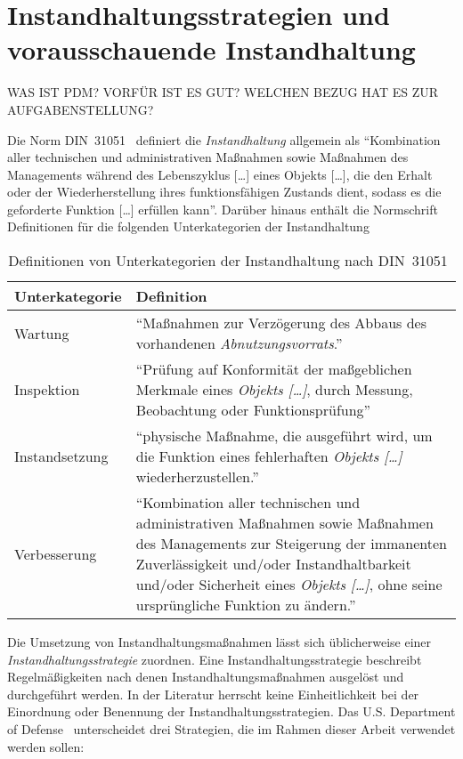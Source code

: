 \chapter{Instandhaltungsstrategien und vorausschauende Instandhaltung}
\label{ch:instandhaltungsstrategien}
WAS IST PDM? VORFÜR IST ES GUT? WELCHEN BEZUG HAT ES ZUR AUFGABENSTELLUNG?

Die Norm DIN~\num{31051}~\cite{DIN.2019} definiert die \textit{Instandhaltung} allgemein als \enquote{Kombination aller technischen und administrativen Maßnahmen sowie Maßnahmen des Managements während des Lebenszyklus [\dots] eines Objekts [\dots], die den Erhalt oder der Wiederherstellung ihres funktionsfähigen Zustands dient, sodass es die geforderte Funktion [\dots] erfüllen kann}. Darüber hinaus enthält die Normschrift Definitionen für die folgenden Unterkategorien der Instandhaltung

\begin{table}[ht]
	\raggedright
	\begin{tabularx}{\textwidth}{ | l | X |}
		\hline
        \rowcolor{lightgray}
        Unterkategorie & Definition\\
        \hline
        Wartung & \enquote{Maßnahmen zur Verzögerung des Abbaus des vorhandenen \textit{Abnutzungsvorrats}.}\\
        \hline
        Inspektion & \enquote{Prüfung auf Konformität der maßgeblichen Merkmale eines \textit{Objekts […]}, durch Messung, Beobachtung oder Funktionsprüfung}\\
        \hline
        Instandsetzung & \enquote{physische Maßnahme, die ausgeführt wird, um die Funktion eines fehlerhaften \textit{Objekts […] }wiederherzustellen.}\\
        \hline
        Verbesserung & \enquote{Kombination aller technischen und administrativen Maßnahmen sowie Maßnahmen des Managements zur Steigerung der immanenten Zuverlässigkeit und/oder Instandhaltbarkeit und/oder Sicherheit eines \textit{Objekts […]}, ohne seine ursprüngliche Funktion zu ändern.}\\
        \hline
	\end{tabularx}
	\caption{Definitionen von Unterkategorien der Instandhaltung nach DIN~\num{31051}~\cite{DIN.2019}}%
	\label{tab:definition_unterkategorien_instandhaltung}	%
\end{table}

Die Umsetzung von Instandhaltungsmaßnahmen lässt sich üblicherweise einer \textit{Instandhaltungsstrategie} zuordnen. Eine Instandhaltungsstrategie beschreibt Regelmäßigkeiten nach denen Instandhaltungsmaßnahmen ausgelöst und durchgeführt werden. In der Literatur herrscht keine Einheitlichkeit bei der Einordnung oder Benennung der Instandhaltungsstrategien. Das U.S. Department of Defense~\cite[p.~16]{U.S.DepartmentofDefense.2008} unterscheidet drei Strategien, die im Rahmen dieser Arbeit verwendet werden sollen:

